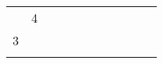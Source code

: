 \begin{table}[]
{\begin{tabular}{lllllllllll}
                          & \cellcolor[HTML]{FC8D59}4 &                   &                                                                          &                                                                        &                           &                                                             &                                                                            &                                                                           &                                 &                                                                        \\
\cellcolor[HTML]{FC8D59}3 &                           &                   &                                                                          &                                                                        &                           &                                                             &                                                                            &                                                                           &                                 &                                                                        \\
                          &                           &                   & \cellcolor[HTML]{FC8D59}    &                                                                        &                           &                                                             &                                                                            &                                                                           &                                 &                                                                       
\end{tabular}%
}
\end{table}

